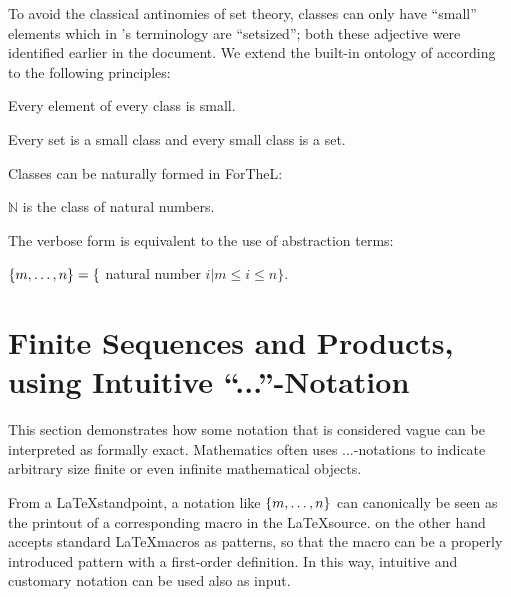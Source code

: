 \documentclass[11pt]{article}
\begin{document}
To avoid the classical antinomies of set theory, 
classes can only have ``small'' elements 
which in \Naproche{}'s terminology are ``setsized'';
both these adjective were identified earlier in the 
document.
We extend the built-in ontology of \Naproche{}
according to the following principles:
\begin{forthel}

\begin{axiom}
Every element of every class is small.
\end{axiom}

\begin{axiom}
Every set is a small class and every small class is a set.
\end{axiom}

\end{forthel}
Classes can be naturally formed in ForTheL: 

\begin{forthel}

\begin{definition} $\mathbb{N}$ is the 
class of natural numbers.
\end{definition}

\end{forthel}

The verbose form is equivalent to the 
use of abstraction terms:

\begin{definition} $\{m,\dots,n\} = \{$ natural number $i | 
m \leq i \leq n \}$.
\end{definition}


\section{Finite Sequences and Products, using Intuitive ``...''-Notation}

This section demonstrates how some notation that is 
considered vague can be interpreted as formally
exact. Mathematics often uses ...-notations to
indicate arbitrary size finite or even infinite mathematical
objects.

From a \LaTeX standpoint, a notation like
$\{m,\dots,n\}$ can canonically be seen as the printout
of a corresponding macro in the \LaTeX source. \Naproche{}
on the other hand accepts standard \LaTeX macros as
patterns, so that the macro can be a properly introduced
\Naproche{} pattern with a first-order definition.
In this way, intuitive and customary notation can be used
also as \Naproche{} input.
\end{document}
